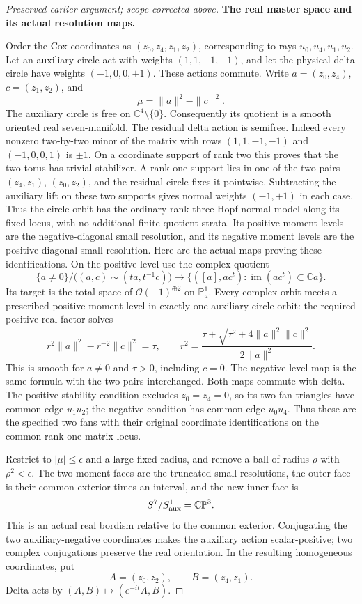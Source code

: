 \begin{proof}[Preserved earlier argument; scope corrected above]
\par\medskip\noindent\textbf{The real master space and its actual resolution maps.}\enspace

Order the Cox coordinates as \((z_0,z_4,z_1,z_2)\), corresponding
to rays \(u_0,u_4,u_1,u_2\).  Let an auxiliary circle act with
weights \((1,1,-1,-1)\), and let the physical delta circle have
weights \((-1,0,0,+1)\).  These actions commute.  Write
\(a=(z_0,z_4)\), \(c=(z_1,z_2)\), and
\[
       \mu=\|a\|^2-\|c\|^2.
\]
The auxiliary circle is free on \(\mathbb C^4\setminus\{0\}\).
Consequently its quotient is a smooth oriented real seven-manifold.
The residual delta action is semifree.  Indeed every nonzero
two-by-two minor of the matrix with rows
\((1,1,-1,-1)\) and \((-1,0,0,1)\) is \(\pm1\).
On a coordinate support of rank two this proves that the
two-torus has trivial stabilizer.  A rank-one support lies in
one of the two pairs \((z_4,z_1)\), \((z_0,z_2)\),
and the residual circle fixes it pointwise.  Subtracting the
auxiliary lift on these two supports gives normal weights
\((-1,+1)\) in each case.  Thus the circle orbit has the
ordinary rank-three Hopf normal model along its fixed locus,
with no additional finite-quotient strata.
Its positive moment levels are the negative-diagonal small resolution,
and its negative moment levels are the positive-diagonal small
resolution.  Here are the actual maps proving these identifications.
On the positive level use the complex quotient
\[
   \{a\ne0\}\big/\bigl((a,c)\sim(ta,t^{-1}c)\bigr)
       \longrightarrow
   \{([a],ac^t):\operatorname{im}(ac^t)\subset\mathbb Ca\}.
\]
Its target is the total space of \(\mathcal O(-1)^{\oplus2}\)
on \(\mathbb P^1_a\).  Every complex orbit meets a prescribed
positive moment level in exactly one auxiliary-circle orbit:
the required positive real factor solves
\[
 r^2\|a\|^2-r^{-2}\|c\|^2=\tau,
 \qquad
 r^2=\frac{\tau+\sqrt{\tau^2+4\|a\|^2\|c\|^2}}
                 {2\|a\|^2}.
\]
This is smooth for \(a\ne0\) and \(\tau>0\), including
\(c=0\).  The negative-level map is the same formula with
the two pairs interchanged.  Both maps commute with delta.
The positive stability condition excludes \(z_0=z_4=0\),
so its two fan triangles have common edge \(u_1u_2\);
the negative condition has common edge \(u_0u_4\).
Thus these are the specified two fans with their original
coordinate identifications on the common rank-one matrix locus.

Restrict to \(|\mu|\le\epsilon\) and a large fixed radius,
and remove a ball of radius \(\rho\) with \(\rho^2<\epsilon\).
The two moment faces are the truncated small resolutions, the
outer face is their common exterior times an interval, and the
new inner face is
\[
             S^7/S^1_{\rm aux}=\mathbb {CP}^3.
\]
This is an actual real bordism relative to the common exterior.
Conjugating the two auxiliary-negative coordinates makes the
auxiliary action scalar-positive; two complex conjugations
preserve the real orientation.  In the resulting homogeneous
coordinates, put
\[
       A=(z_0,\overline z_2),\qquad
       B=(z_4,\overline z_1).
\]
Delta acts by \((A,B)\mapsto(e^{-it}A,B)\).


\end{proof}
